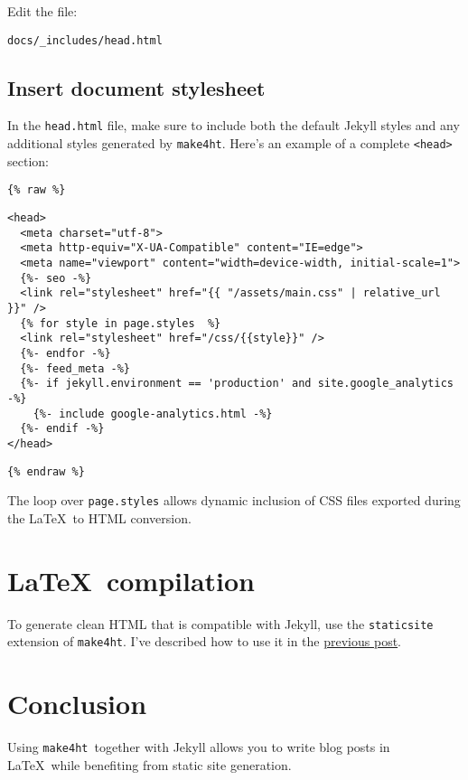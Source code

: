 \documentclass{article}
\def\makeht{\texttt{make4ht}}
\begin{document}
Edit the file:

\begin{verbatim}
docs/_includes/head.html
\end{verbatim}

\subsection{Insert document stylesheet}

In the \texttt{head.html} file, make sure to include both the default Jekyll styles
and any additional styles generated by \makeht. Here's an example of a complete \texttt{<head>} section:

\ifdefined\HCode\verb|{% raw %}|\fi
\begin{verbatim}
<head>
  <meta charset="utf-8">
  <meta http-equiv="X-UA-Compatible" content="IE=edge">
  <meta name="viewport" content="width=device-width, initial-scale=1">
  {%- seo -%}
  <link rel="stylesheet" href="{{ "/assets/main.css" | relative_url }}" />
  {% for style in page.styles  %}
  <link rel="stylesheet" href="/css/{{style}}" />
  {%- endfor -%}
  {%- feed_meta -%}
  {%- if jekyll.environment == 'production' and site.google_analytics -%}
    {%- include google-analytics.html -%}
  {%- endif -%}
</head>
\end{verbatim}
\ifdefined\HCode\verb|{% endraw %}|\fi

The loop over \texttt{page.styles} allows dynamic inclusion of CSS files 
exported during the \LaTeX\ to HTML conversion.

\section{\LaTeX\ compilation}

To generate clean HTML that is compatible with Jekyll, 
use the \texttt{staticsite} extension of \makeht. I've described
how to use it in the \href{testblog/2021/07/30/how-to-blog-with-tex4ht.html}{previous post}.


\section{Conclusion}

Using \makeht\ together with Jekyll allows you to write blog posts in \LaTeX\ 
while benefiting from static site generation. 
\end{document}
